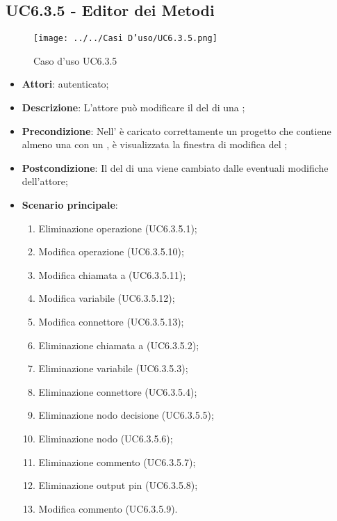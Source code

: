 \subsection{UC6.3.5 - Editor  dei Metodi}
\label{ssec:UC6.3.5}
\begin{figure}[h!]
\centering
\texttt{[image: ../../Casi D'uso/UC6.3.5.png]}
\caption{Caso d'uso UC6.3.5}
 \end{figure}
\begin{itemize}
\item \textbf{Attori}:  autenticato;
\item \textbf{Descrizione}: L'attore può modificare il  del  di una ;
\item \textbf{Precondizione}: Nell' è caricato correttamente un progetto che  contiene almeno una  con un , è visualizzata la finestra di modifica del ;
\item \textbf{Postcondizione}: Il  del  di una  viene cambiato dalle eventuali modifiche dell'attore;
\item \textbf{Scenario principale}: \begin{enumerate}\item Eliminazione operazione (UC6.3.5.1);\item Modifica operazione (UC6.3.5.10);\item Modifica chiamata a  (UC6.3.5.11);\item Modifica variabile (UC6.3.5.12);\item Modifica connettore (UC6.3.5.13);\item Eliminazione chiamata a  (UC6.3.5.2);\item Eliminazione variabile (UC6.3.5.3);\item Eliminazione connettore (UC6.3.5.4);\item Eliminazione nodo decisione (UC6.3.5.5);\item Eliminazione nodo  (UC6.3.5.6);\item Eliminazione commento (UC6.3.5.7);\item Eliminazione output pin (UC6.3.5.8);\item Modifica commento (UC6.3.5.9).
 \end{enumerate}
\end{itemize}
